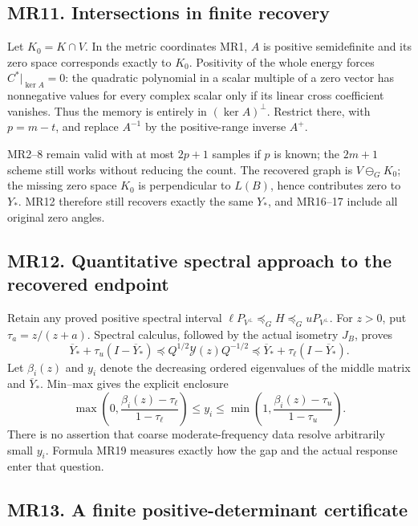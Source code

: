 \documentclass[11pt]{article}
\begin{document}
\subsection{MR11. Intersections in finite recovery}\label{mr11.-intersections-in-finite-recovery}

Let \(K_0=K\cap V\). In the metric coordinates MR1, \(A\) is positive semidefinite and its zero space corresponds exactly to \(K_0\). Positivity of the whole energy forces \(C^*|_{\ker A}=0\): the quadratic polynomial in a scalar multiple of a zero vector has nonnegative values for every complex scalar only if its linear cross coefficient vanishes. Thus the memory is entirely in \((\ker A)^\perp\). Restrict there, with \(p=m-t\), and replace \(A^{-1}\) by the positive-range inverse \(A^+\).

MR2--8 remain valid with at most \(2p+1\) samples if \(p\) is known; the \(2m+1\) scheme still works without reducing the count. The recovered graph is \(V\ominus_G K_0\); the missing zero space \(K_0\) is perpendicular to \(L(B)\), hence contributes zero to \(Y_*\). MR12 therefore still recovers exactly the same \(Y_*\), and MR16--17 include all original zero angles.

\subsection{MR12. Quantitative spectral approach to the recovered endpoint}\label{mr12.-quantitative-spectral-approach-to-the-recovered-endpoint}

Retain any proved positive spectral interval \(\ell P_{V^\perp}\preceq_G H\preceq_G uP_{V^\perp}\). For \(z>0\), put \(\tau_a=z/(z+a)\). Spectral calculus, followed by the actual isometry \(J_B\), proves \[
 \boxed{\overline Y_*+\tau_u(I-\overline Y_*)
 \preceq Q^{1/2}\mathscr Y(z)Q^{-1/2}
 \preceq\overline Y_*+\tau_\ell(I-\overline Y_*).}
\tag{MR18}
\] Let \(\beta_i(z)\) and \(y_i\) denote the decreasing ordered eigenvalues of the middle matrix and \(\overline Y_*\). Min--max gives the explicit enclosure \[
 \max\left(0,\frac{\beta_i(z)-\tau_\ell}{1-\tau_\ell}\right)
 \le y_i\le
 \min\left(1,\frac{\beta_i(z)-\tau_u}{1-\tau_u}\right).
\tag{MR19}
\] There is no assertion that coarse moderate-frequency data resolve arbitrarily small \(y_i\). Formula MR19 measures exactly how the gap and the actual response enter that question.

\subsection{MR13. A finite positive-determinant certificate}\label{mr13.-a-finite-positive-determinant-certificate}
\end{document}
